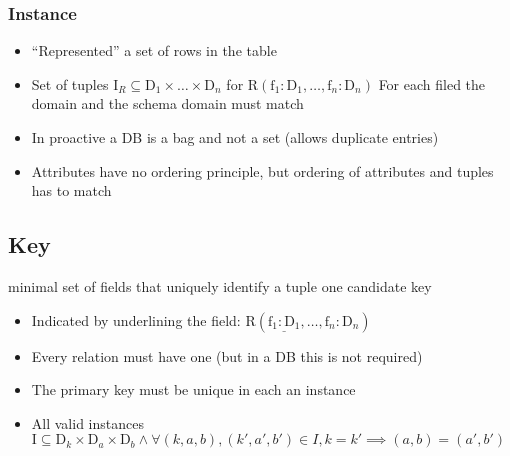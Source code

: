 \subsubsection{Instance}
\begin{itemize}
    \item ``Represented'' a set of rows in the table
    \item Set of tuples $\text{I}_R \subseteq \text{D}_1 \times \dots \times \text{D}_n$ for $\text{R}(\text{f}_1: \text{D}_1, \dots, \text{f}_n:\text{D}_n)$
     For each filed the domain and the schema domain must match
    \item In proactive a DB is a bag and not a set (allows duplicate entries)
    \item Attributes have no ordering principle, but ordering of attributes and tuples has to match
\end{itemize}

\subsection{Key}
\begin{itemize}
     minimal set of fields that uniquely identify a tuple
     one candidate key
        \begin{itemize}
            \item Indicated by underlining the field: $\text{R}(\underline{\text{f}_1: \text{D}_1}, \dots, \text{f}_n:\text{D}_n)$
            \item Every relation must have one (but in a DB this is not required)
        \end{itemize}
        \begin{itemize}
            \item The primary key must be unique in each an instance
            \item All valid instances $\text{I} \subseteq \text{D}_k \times \text{D}_a \times \text{D}_b \wedge \forall (k, a, b), (k', a', b') \in I, k = k' \implies (a, b) = (a', b')$
        \end{itemize}
\end{itemize}
